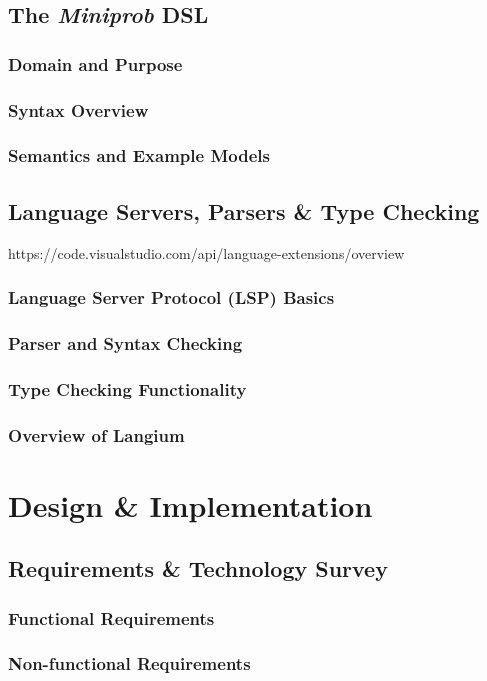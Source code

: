 \documentclass[11pt]{report}
\begin{document}
\chapter{The \textit{Miniprob} DSL}
\section{Domain and Purpose}
\section{Syntax Overview}
\section{Semantics and Example Models}

\chapter{Language Servers, Parsers \& Type Checking}
https://code.visualstudio.com/api/language-extensions/overview
\section{Language Server Protocol (LSP) Basics}
\section{Parser and Syntax Checking}
\section{Type Checking Functionality}
\section{Overview of Langium}

\part{Design \& Implementation}

\chapter{Requirements \& Technology Survey}
\section{Functional Requirements}
\section{Non-functional Requirements}
\end{document}
